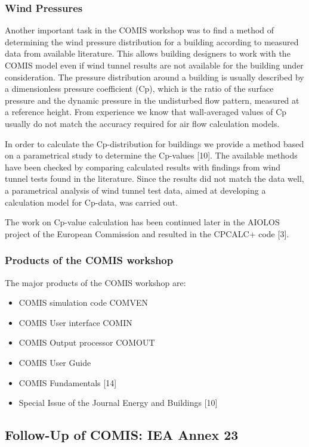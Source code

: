 \documentclass[10pt]{article}
\begin{document}
\subsubsection{Wind Pressures}

Another important task in the COMIS workshop was to find a method of determining the wind pressure distribution for a building according to measured data from available literature. This allows building designers to work with the COMIS model even if wind tunnel results are not available for the building under consideration. The pressure distribution around a building is usually described by a dimensionless pressure coefficient (Cp), which is the ratio of the surface pressure and the dynamic pressure in the undisturbed flow pattern, measured at a reference height. From experience we know that wall-averaged values of Cp usually do not match the accuracy required for air flow calculation models.

In order to calculate the Cp-distribution for buildings we provide a method based on a parametrical study to determine the Cp-values [10]. The available methods have been checked by comparing calculated results with findings from wind tunnel tests found in the literature. Since the results did not match the data well, a parametrical analysis of wind tunnel test data, aimed at developing a calculation model for Cp-data, was carried out.

The work on Cp-value calculation has been continued later in the AIOLOS project of the European Commission and resulted in the CPCALC+ code [3].

\subsubsection{Products of the COMIS workshop}

The major products of the COMIS workshop are: 

\begin{itemize}
\item COMIS simulation code COMVEN
\item COMIS User interface COMIN
\item COMIS Output processor COMOUT
\item COMIS User Guide
\item COMIS Fundamentals [14]
\item Special Issue of the Journal Energy and Buildings [10]
\end{itemize}

\subsection{Follow-Up of COMIS: IEA Annex 23}
\end{document}
